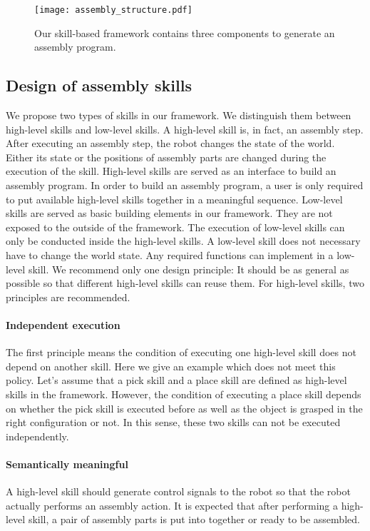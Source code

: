 \begin{figure}[!htbp]
\centering
\texttt{[image: assembly\_structure.pdf]}
\captionsetup{justification=raggedright}
\caption{Our skill-based framework contains three components to generate an assembly program.}
\label{fig:assembly_structure}       %
\end{figure} 

\subsection{Design of assembly skills}
We propose two types of skills in our framework. We distinguish them between high-level skills and low-level skills.  A high-level skill is, in fact, an assembly step. After executing an assembly step, the robot changes the state of the world. Either its state or the positions of assembly parts are changed during the execution of the skill. High-level skills are served as an interface to  build an assembly program. In order to build an assembly program, a user is only required to put available high-level skills together in a meaningful sequence. Low-level skills are served as basic building elements in our framework. They are not exposed to the outside of the framework. The execution of low-level skills can only be conducted inside the high-level skills. A low-level skill does not necessary have to change the world state. Any required functions can implement in a low-level skill. We recommend only one design principle: It should be as general as possible so that different high-level skills can reuse them. For high-level skills, two principles are recommended. 
\paragraph{Independent execution}
The first principle means the condition of executing one high-level skill does not depend on another skill. Here we give an example which does not meet this policy. Let's assume that a pick skill and a place skill are defined as high-level skills in the framework. However, the condition of executing a place skill depends on whether the pick skill is executed before as well as the object is grasped in the right configuration or not. In this sense, these two skills can not be executed independently. 
 
\paragraph{Semantically meaningful}
A high-level skill should generate control signals to the robot so that the robot actually performs an assembly action. It is expected that after performing a high-level skill, a pair of assembly parts is put into together or ready to be assembled.
 

